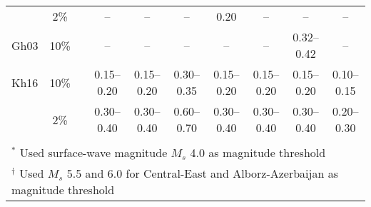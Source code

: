 \begin{table*}[t]
\begin{tabular}{lccccccccc}
            &   2\%  &&   --        &   --        &   --        &   0.20      &   --        &     --      &     --      \\
    Gh03    &  10\%  &&   --        &   --        &   --        &   --        &   --        & 0.32--0.42  &     --      \\
    Kh16    &  10\%  &&  0.15--0.20 & 0.15--0.20  & 0.30--0.35  & 0.15--0.20  & 0.15--0.20  & 0.15--0.20  & 0.10--0.15  \\
            &   2\%  &&  0.30--0.40 & 0.30--0.40  & 0.60--0.70  & 0.30--0.40  & 0.30--0.40  & 0.30--0.40  & 0.20--0.30  \\
    \hline                                                                                                              \\[-1.6ex]
    \multicolumn{10}{l}{\small{${}^{*}$ Used surface-wave magnitude $M_s$ 4.0 as magnitude threshold}}                  \\
    \multicolumn{10}{l}{\small{${}^{\dagger}$ Used $M_s$ 5.5 and 6.0 for Central-East and Alborz-Azerbaijan as magnitude threshold}}
\end{tabular}
\label{tab:pga}
\end{table*}
